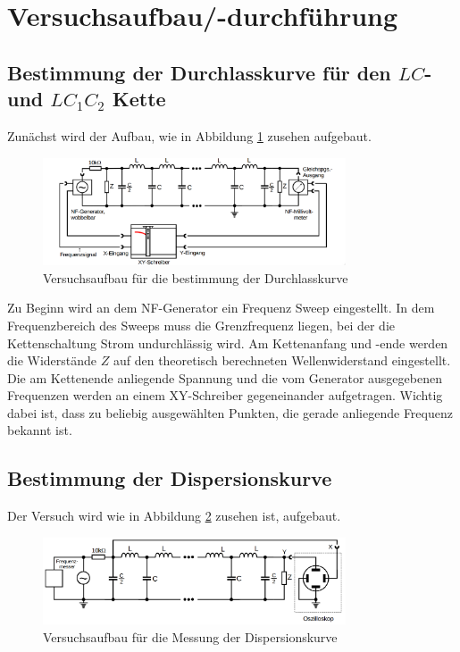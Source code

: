 \section{Versuchsaufbau/-durchführung}

\subsection{Bestimmung der Durchlasskurve für den $LC$- und $LC_1 C_2$ Kette}
Zunächst wird der Aufbau, wie in Abbildung \ref{fig:aufbau_durchlass} zusehen aufgebaut.
\begin{figure}
  \centering
  \includegraphics[width=0.8\textwidth]{bilder/versuchsaufbau_1.png}
  \caption{Versuchsaufbau für die bestimmung der Durchlasskurve}
  \label{fig:aufbau_durchlass}
\end{figure}

Zu Beginn wird an dem NF-Generator ein Frequenz Sweep eingestellt.
In dem Frequenzbereich des Sweeps muss die Grenzfrequenz liegen, bei der die 
Kettenschaltung Strom undurchlässig wird.
Am Kettenanfang und -ende werden die Widerstände $Z$ auf den theoretisch 
berechneten Wellenwiderstand eingestellt.
Die am Kettenende anliegende Spannung und die vom Generator ausgegebenen Frequenzen 
werden an einem XY-Schreiber gegeneinander aufgetragen.
Wichtig dabei ist, dass zu beliebig ausgewählten Punkten, die gerade anliegende Frequenz bekannt ist. %


\subsection{Bestimmung der Dispersionskurve}
Der Versuch wird wie in Abbildung \ref{fig:aufbau_dispersion} zusehen ist, aufgebaut.
\begin{figure}
  \centering
  \includegraphics[width=0.8\textwidth]{bilder/versuchsaufbau_dispersion.png}
  \caption{Versuchsaufbau für die Messung der Dispersionskurve}
  \label{fig:aufbau_dispersion}
\end{figure}

